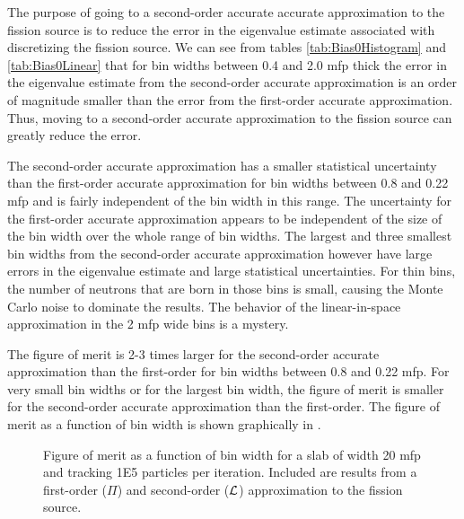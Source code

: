\begin{comment}
         90 & 0.22 & 3.2808 & 4.6\e{-3} & 2.0\e{-4} & 2251.3 \\
        105 & 0.19 & 3.1759 & 4.3\e{-3} & 1.8\e{-3} & 877.1 \\
        120 & 0.17 & 2.8474 & 1.7\e{-2} & 1.1\e{-2} & 189.4 \\
        135 & 0.15 & 1.7544 & 2.0\e{-2} & 1.7\e{-2} & 66.2 \\
        150 & 0.13 & 1.4275 & 3.6\e{-3} & 1.8\e{-2} & 73.0 \\        
        \bottomrule
    \end{tabular}
    \caption{Second higher order eigenvalue bias for second-order accurate ($\Lin$) spatial discretization.  }
    \label{tab:Bias2Linear}
\end{table}
\end{comment}

The purpose of going to a second-order accurate accurate approximation to the fission source is to reduce the error in the eigenvalue estimate associated with discretizing the fission source.  We can see from tables \ref{tab:Bias0Histogram} and \ref{tab:Bias0Linear} that for bin widths between 0.4 and 2.0 mfp thick the error in the eigenvalue estimate from the second-order accurate approximation is an order of magnitude smaller than the error from the first-order accurate approximation.  Thus, moving to a second-order accurate approximation to the fission source can greatly reduce the error.  

The second-order accurate approximation has a smaller statistical uncertainty than the first-order accurate approximation for bin widths between 0.8 and 0.22 mfp and is fairly independent of the bin width in this range.  The uncertainty for the first-order accurate approximation appears to be independent of the size of the bin width over the whole range of bin widths.  The largest and three smallest bin widths from the second-order accurate approximation however have large errors in the eigenvalue estimate and large statistical uncertainties.  For thin bins, the number of neutrons that are born in those bins is small, causing the Monte Carlo noise to dominate the results.  The behavior of the linear-in-space approximation in the 2 mfp wide bins is a mystery.

The figure of merit is 2-3 times larger for the second-order accurate approximation than the first-order for bin widths between 0.8 and 0.22 mfp.  For very small bin widths or for the largest bin width, the figure of merit is smaller for the second-order accurate approximation than the first-order.  The figure of merit as a function of bin width is shown graphically in .
\begin{sidewaysfigure} \centering
    
    \caption{Figure of merit as a function of bin width for a slab of width 20 mfp and tracking 1E5 particles per iteration.  Included are results from a first-order ($\Pi$) and second-order ($\mathcal{L}$) approximation to the fission source.}
    \label{fig:BiasFOM}
\end{sidewaysfigure}

